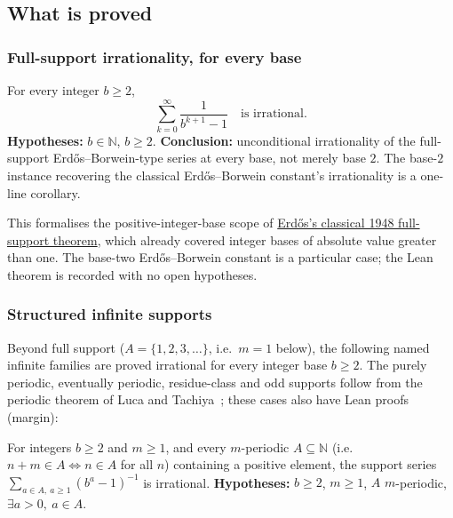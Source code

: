 \subsection{What is proved}

\subsubsection{Full-support irrationality, for every base}

\begin{thm}
\label{thm:full-support}
For every integer $b \ge 2$,
\[
\sum_{k=0}^{\infty} \frac{1}{b^{k+1}-1} \quad \text{is irrational.}
\]
\textbf{Hypotheses:} $b \in \mathbb{N}$, $b \ge 2$. \textbf{Conclusion:} unconditional irrationality
of the full-support Erd\H{o}s--Borwein-type series at every base, not merely base $2$.
The base-$2$ instance recovering the classical Erd\H{o}s--Borwein constant's irrationality
is a one-line corollary.
\end{thm}

This formalises the positive-integer-base scope of
\href{https://www.renyi.hu/~p_erdos/1948-04.pdf}{Erd\H{o}s's classical 1948 full-support theorem},
which already covered integer bases of absolute value greater than one. The base-two
Erd\H{o}s--Borwein constant is a particular case; the Lean theorem is recorded with no open
hypotheses.

\subsubsection{Structured infinite supports}

Beyond full support ($A = \{1,2,3,\dots\}$, i.e.\ $m=1$ below), the following named infinite
families are proved irrational for every integer base $b\ge2$.  The purely
periodic, eventually periodic, residue-class and odd supports follow from the periodic theorem of
Luca and Tachiya~\cite[Theorem~A, p.~139]{lucatachiya2017}; these cases also have Lean proofs
(margin):

\begin{thm}\label{thm:purely-periodic-support}
For integers $b\ge2$ and $m\ge1$, and every $m$-periodic $A\subseteq\mathbb N$ (i.e.\
$n+m \in A \Leftrightarrow n \in A$ for all $n$) containing a positive element, the support series
$\sum_{a\in A,\ a\ge1}(b^a-1)^{-1}$ is irrational. \textbf{Hypotheses:} $b \ge 2$, $m \ge 1$, $A$
$m$-periodic, $\exists a > 0,\ a \in A$.
\end{thm}

